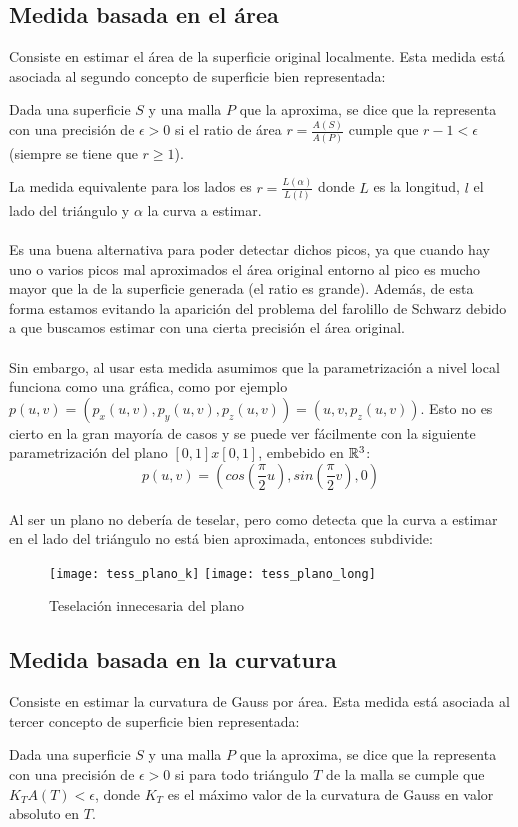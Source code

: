 	\newpage
	\subsection*{Medida basada en el área}
	
	Consiste en estimar el área de la superficie original localmente. Esta medida está asociada al segundo concepto de superficie bien representada:
	\begin{definicion}
		Dada una superficie $S$ y una malla $P$ que la aproxima, se dice que la representa con una precisión de $\epsilon > 0$ si el ratio de área $r=\frac{A(S)} {A(P)}$ cumple que $r-1 < \epsilon$ (siempre se tiene que $r\geq 1$).
	\end{definicion}
	
	La medida equivalente para los lados es $r=\frac{L(\alpha)} {L(l)}$ donde $L$ es la longitud, $l$ el lado del triángulo y $\alpha$ la curva a estimar.\\
	\\Es una buena alternativa para poder detectar dichos picos, ya que cuando hay uno o varios picos mal aproximados el área original entorno al pico es mucho mayor que la de la superficie generada (el ratio es grande). Además, de esta forma estamos evitando la aparición del problema del farolillo de Schwarz \cite{SchLantern} debido a que buscamos estimar con una cierta precisión el área original.\\
	\\Sin embargo, al usar esta medida asumimos que la parametrización a nivel local funciona como una gráfica, como por ejemplo $p(u,v)=(p_x(u,v),p_y(u,v),p_z(u,v)) = (u,v,p_z(u,v))$. Esto no es cierto en la gran mayoría de casos y se puede ver fácilmente con la siguiente parametrización del plano $[0,1]x[0,1]$, embebido en $\mathbb{R}^3$:
	$$p(u,v)=(cos(\frac{\pi}{2} u), sin(\frac{\pi}{2} v), 0 )$$
	\\Al ser un plano no debería de teselar, pero como detecta que la curva a estimar en el lado del triángulo no está bien aproximada, entonces subdivide:
	\begin{figure}[h]
  		\centering
  		\texttt{[image: tess\_plano\_k]}
  		\texttt{[image: tess\_plano\_long]}
  		\caption{Teselación innecesaria del plano}
  		\label{fig:plano_tess}
	\end{figure}
	
	\subsection*{Medida basada en la curvatura}
	Consiste en estimar la curvatura de Gauss por área. Esta medida está asociada al tercer concepto de superficie bien representada:
	\begin{definicion}
		Dada una superficie $S$ y una malla $P$ que la aproxima, se dice que la representa con una precisión de $\epsilon > 0$ si para todo triángulo $T$ de la malla se cumple que $K_T A(T) < \epsilon$, donde $K_T$ es el máximo valor de la curvatura de Gauss en valor absoluto en $T$.
	\end{definicion}
	
